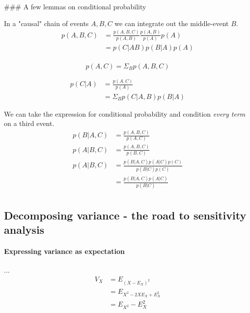 ### A few lemmas on conditional probability \label{condPropLemmas}

In a "causal" chain of events $A, B, C$ we can integrate out the middle-event $B$.
\begin{equation}
    \begin{aligned}
        p(A, B, C)  &= \frac{p(A, B, C)}{p(A, B)} \frac{p(A, B)}{p(A)} p(A) \\
                    &= p(C|AB) p(B|A) p(A) \\
    \end{aligned}
\end{equation}

\begin{equation}
    p(A, C) = \Sigma_B p(A, B, C)
\end{equation}

\begin{equation}
    \begin{aligned}
            p(C | A) &= \frac{p(A, C)}{p(A)} \\
                     &= \Sigma_B p(C|A, B) p(B|A)
    \end{aligned}
\end{equation}

We can take the expression for conditional probability and condition \emph{every term} on a third event.
\begin{equation}
    \begin{aligned}
        p(B|A, C) &= \frac{p(A, B, C)}{p(A, C)} \\
        p(A|B, C) &= \frac{p(A, B, C)}{p(B, C)} \\
        p(A|B, C) &= \frac{p(B|A, C) p(A|C) p(C)}{p(B|C)p(C)} \\
                  &= \frac{p(B|A, C) p(A|C)}{p(B|C)} \\
    \end{aligned}
\end{equation}


\subsection{Decomposing variance - the road to sensitivity analysis}

\paragraph{Expressing variance as expectation} ...
\begin{equation}
    \begin{aligned}
        V_X &= E_{ (X - E_X)^2 } \\
            &= E_{ X^2 - 2 X E_X + E_X^2 } \\
            &= E_{X^2} - E_X^2
    \end{aligned}
\end{equation}

